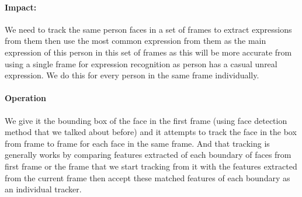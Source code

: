 \paragraph{Impact:} We need to track the same person faces in a set of frames to extract expressions from them then use the most common expression from them as the main expression of this person in this set of frames as this will be more accurate from using a single frame for expression recognition as person has a casual unreal expression. We do this for every person in the same frame individually.
\paragraph{Operation} We give it the bounding box of the face in the first frame (using face detection method that we talked about before) and it attempts to track the face in the box from frame to frame for each face in the same frame.\newline
And that tracking is generally works by comparing features extracted of each boundary of faces from first frame or the frame that we start tracking from it with the features extracted from the current frame then accept these matched features of each boundary as an individual tracker.

